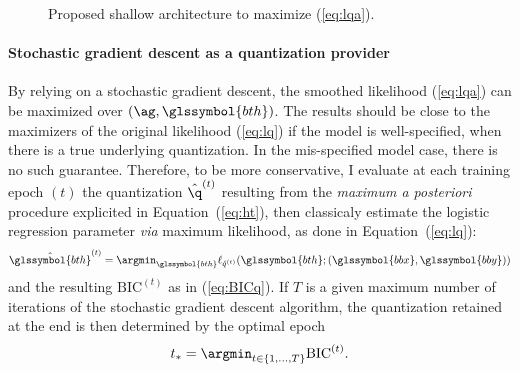 \begin{figure}[h!]
\caption{Proposed shallow architecture to maximize (\ref{eq:lqa}).}
\label{fig:nn}
\end{figure}


\paragraph{Stochastic gradient descent as a quantization provider}

By relying on a stochastic gradient descent, the smoothed likelihood (\ref{eq:lqa}) can be maximized over $\left(\ag, \glssymbol{bth} \right)$. The results should be close to the maximizers of the original likelihood (\ref{eq:lq}) if the model is well-specified, when there is a true underlying quantization. In the mis-specified model case, there is no such guarantee. Therefore, to be more conservative, I evaluate at each training epoch $(t)$ the quantization $\hat{\q}^{(t)}$ resulting from the \textit{maximum a posteriori} procedure explicited in Equation~(\ref{eq:ht}), then classicaly estimate the logistic regression parameter \textit{via} maximum likelihood, as done in Equation~(\ref{eq:lq}):
\[\hat{\glssymbol{bth}}^{(t)} = \argmin_{\glssymbol{bth}} \ell_{\hat{q}^{(t)}}(\glssymbol{bth}; (\glssymbol{bbx},\glssymbol{bby}))\]
and the resulting $\mbox{BIC}^{(t)}$ as in (\ref{eq:BICq}). If $T$ is a given maximum number of iterations of the stochastic gradient descent algorithm, the quantization retained at the end is then determined by the optimal epoch
\[t_*=\argmin_{t\in \{1,\ldots, T\}} \mbox{BIC}^{(t)}.\]
 
